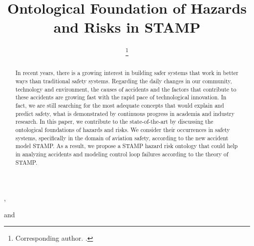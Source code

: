\documentclass[sw]{iosart2x}
\begin{document}
\def\theequation{A\arabic{equation}}
\begin{frontmatter}
\title{Ontological Foundation of Hazards and Risks in STAMP}
\author[A]{ %
\thanks{Corresponding author. .}},
\author[A]{ }
and
\author[B]{ }
\address[A]{Department of Cybernetics, , }
\address[B]{Department of Air Transport, , }

\begin{abstract}
In recent years, there is a growing interest in building safer systems that work in better ways than traditional safety systems. Regarding the daily changes in our community, technology and environment, the causes of accidents and the factors that contribute to these accidents are growing fast with the rapid pace of technological innovation. In fact, we are still searching for the most adequate concepts that would explain and predict safety, what is demonstrated by continuous progress in academia and industry research. In this paper, we contribute to the state-of-the-art by discussing the ontological foundations of hazards and risks. We consider their occurrences in safety systems, specifically in the domain of aviation safety, according to the new accident model STAMP. As a result, we propose a STAMP hazard risk ontology that could help in analyzing accidents and modeling control loop failures according to the theory of STAMP. 
\end{abstract}

\begin{keyword}
\end{keyword}

\end{frontmatter}
\end{document}

